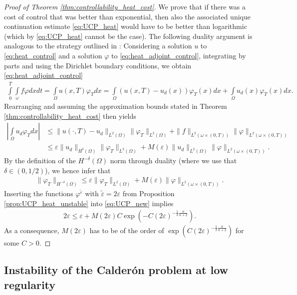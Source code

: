 \documentclass[12pt,twoside]{amsart}
\numberwithin{equation}{section}
\renewcommand{\leq}{\leqslant}
\newcommand{\eps}{\varepsilon}
\begin{document}
\begin{proof}[Proof of Theorem \ref{thm:controllability_heat_cost}]
We prove that if there was a cost of control that was better than exponential, then also the associated unique continuation estimate \eqref{eq:UCP_heat} would have to be better than logarithmic (which by \eqref{eq:UCP_heat} cannot be the case). The following duality argument is analogous to the strategy outlined in \cite{Phung}:
Considering a solution $u$ to \eqref{eq:heat_control} and a solution $\varphi$ to \eqref{eq:heat_adjoint_control}, integrating by parts and using the Dirichlet boundary conditions, we obtain  \eqref{eq:heat_adjoint_control}
\begin{align*}
\int\limits_{0}^T \int\limits_{\omega} f \varphi dx dt
= \int\limits_{\Omega} u(x, T) \varphi_T dx
= \int\limits_{\Omega} (u(x,T) - u_d(x)) \varphi_T(x) dx + \int\limits_{\Omega} u_d(x) \varphi_T(x)dx.
\end{align*}
Rearranging and assuming the approximation bounds stated in Theorem \ref{thm:controllability_heat_cost} then yields
\begin{align*}
\left| \int\limits_{\Omega} u_d \varphi_T dx \right|
&\leq \|u(\cdot, T)-u_d\|_{L^2(\Omega)} \|\varphi_T\|_{L^2(\Omega)} + \|f\|_{L^2(\omega \times (0,T))} \|\varphi\|_{L^2(\omega \times (0,T))}\\
&\leq \eps \|u_d\|_{H^{\delta}(\Omega)} \|\varphi_T\|_{L^2(\Omega)}+ M(\eps) \|u_d\|_{L^2(\Omega)}\|\varphi\|_{L^2(\omega \times (0,T))}.
\end{align*}
By the definition of the $H^{-\delta}(\Omega)$ norm through duality (where we use that $\delta \in (0,1/2)$), we hence infer that 
\begin{align}
\label{eq:UCP_new}
\|\varphi_T\|_{H^{-\delta}(\Omega)} \leq \eps\|\varphi_T\|_{L^{2}(\Omega)}  + M(\eps)\|\varphi\|_{L^2(\omega \times (0,T))}.
\end{align}
Inserting the functions $\varphi^{\tilde{\eps}}$ with $\tilde{\eps}=2\eps$ from Proposition \ref{prop:UCP_heat_unstable} into \eqref{eq:UCP_new} implies 
\begin{align}
\label{eq:UCP_new1}
2 \eps \leq \eps + M(2 \eps)C \exp(-C (2\eps)^{-\frac{1}{\delta}\frac{n}{n+2}}).
\end{align}
As a consequence, $M(2 \eps)$ has to be of the order of $\exp(C(2\eps)^{-\frac{1}{\delta}\frac{n}{n+2}})$ for some $C>0$.
\end{proof}


\subsection{Instability of the Calder\'on problem at low regularity}
\label{sec:Calderon}
\end{document}
